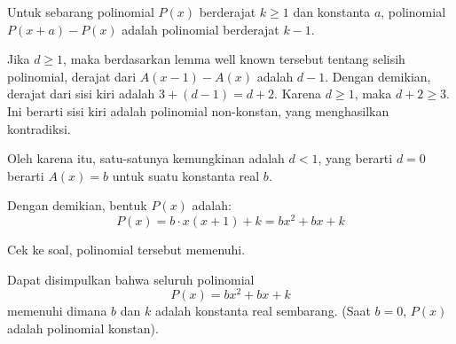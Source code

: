 \begin{solusi}
    \begin{lemma*}
    Untuk sebarang polinomial $P(x)$ berderajat $k \ge 1$ dan konstanta $a$, polinomial $P(x+a)-P(x)$ adalah polinomial berderajat $k-1$.
    \end{lemma*}
    
    Jika $d \ge 1$, maka berdasarkan lemma well known tersebut tentang selisih polinomial, derajat dari $A(x-1)-A(x)$ adalah $d-1$. Dengan demikian, derajat dari sisi kiri adalah $3 + (d-1) = d+2$. Karena $d \ge 1$, maka $d+2 \ge 3$. Ini berarti sisi kiri adalah polinomial non-konstan, yang menghasilkan kontradiksi.
     
    Oleh karena itu, satu-satunya kemungkinan adalah $d < 1$, yang berarti $d=0$ berarti $A(x)=b$ untuk suatu konstanta real $b$.
    
    Dengan demikian, bentuk $P(x)$ adalah:
    \[ P(x) = b \cdot x(x+1) + k = bx^2 + bx + k \]
    
    Cek ke soal, polinomial tersebut memenuhi.
    
    Dapat disimpulkan bahwa seluruh polinomial
    \[ P(x) = bx^2 + bx + k \]
    memenuhi dimana $b$ dan $k$ adalah konstanta real sembarang. (Saat $b=0$, $P(x)$ adalah polinomial konstan).

\end{solusi}